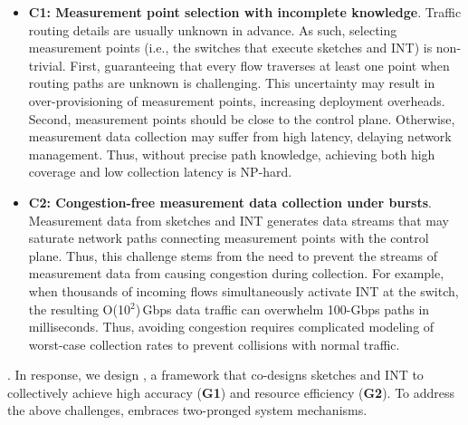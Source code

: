 \begin{itemize}[leftmargin=*]
%
    \item \textbf{C1: Measurement point selection with incomplete knowledge}. Traffic routing details are usually unknown in advance. As such, selecting measurement points (i.e., the switches that execute sketches and INT) is non-trivial. First, guaranteeing that every flow traverses at least one point when routing paths are unknown is challenging. This uncertainty may result in over-provisioning of measurement points, increasing deployment overheads. Second, measurement points should be close to the control plane. Otherwise, measurement data collection may suffer from high latency, delaying network management. Thus, without precise path knowledge, achieving both high coverage and low collection latency is NP-hard. 
%
%
    \item \textbf{C2: Congestion-free measurement data collection under bursts}. Measurement data from sketches and INT generates data streams that may saturate network paths connecting measurement points with the control plane. Thus, this challenge stems from the need to prevent the streams of measurement data from causing congestion during collection. For example, when thousands of incoming flows simultaneously activate INT at the switch, the resulting O(10$^2$)\,Gbps data traffic can overwhelm 100-Gbps paths in milliseconds. Thus, avoiding congestion requires complicated modeling of worst-case collection rates to prevent collisions with normal traffic. 
%
\end{itemize}

. In response, we design \sysname, a framework that co-designs sketches and INT to collectively achieve high accuracy (\textbf{G1}) and resource efficiency (\textbf{G2}). To address the above challenges, \sysname embraces two-pronged system mechanisms. 

